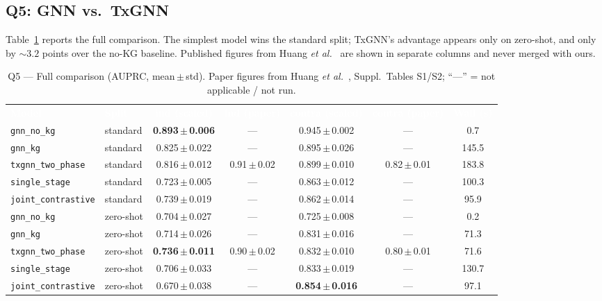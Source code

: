 \documentclass[conference]{IEEEtran}
\newcommand{\hdr}[1]{\textcolor{white}{\textbf{#1}}}
\newcommand{\best}[1]{\textcolor{cgood}{\textbf{#1}}}
\begin{document}
\subsection{Q5: GNN vs.\ TxGNN}
Table~\ref{tab:q5} reports the full comparison. The simplest model wins the
standard split; TxGNN's advantage appears only on zero-shot, and only by
${\sim}3.2$ points over the no-KG baseline. Published figures from
Huang \emph{et al.}~\cite{huang2024} are shown in separate columns and never
merged with ours.

\begin{table}[t]
\centering
\caption{Q5 --- Full comparison (AUPRC, mean\,$\pm$\,std). Paper figures from
Huang \emph{et al.}~\cite{huang2024}, Suppl.\ Tables S1/S2; ``---'' = not
applicable / not run.}
\label{tab:q5}
\renewcommand{\arraystretch}{1.25}
\begin{tabular}{l l c c c c c}
\rowcolor{brandindigo}
\hdr{Model} & \hdr{Split} & \hdr{ind (scaled)} & \hdr{ind (paper)} &
\hdr{contra (scaled)} & \hdr{contra (paper)} & \hdr{Wall (s)}\\
\texttt{gnn\_no\_kg}        & standard  & \best{0.893\,$\pm$\,0.006} & --- & 0.945\,$\pm$\,0.002 & --- & 0.7\\
\rowcolor{rowalt}
\texttt{gnn\_kg}            & standard  & 0.825\,$\pm$\,0.022 & --- & 0.895\,$\pm$\,0.026 & --- & 145.5\\
\texttt{txgnn\_two\_phase}  & standard  & 0.816\,$\pm$\,0.012 & 0.91\,$\pm$\,0.02 & 0.899\,$\pm$\,0.010 & 0.82\,$\pm$\,0.01 & 183.8\\
\rowcolor{rowalt}
\texttt{single\_stage}      & standard  & 0.723\,$\pm$\,0.005 & --- & 0.863\,$\pm$\,0.012 & --- & 100.3\\
\texttt{joint\_contrastive} & standard  & 0.739\,$\pm$\,0.019 & --- & 0.862\,$\pm$\,0.014 & --- & 95.9\\
\rowcolor{rowalt}
\texttt{gnn\_no\_kg}        & zero-shot & 0.704\,$\pm$\,0.027 & --- & 0.725\,$\pm$\,0.008 & --- & 0.2\\
\texttt{gnn\_kg}            & zero-shot & 0.714\,$\pm$\,0.026 & --- & 0.831\,$\pm$\,0.016 & --- & 71.3\\
\rowcolor{rowalt}
\texttt{txgnn\_two\_phase}  & zero-shot & \best{0.736\,$\pm$\,0.011} & 0.90\,$\pm$\,0.02 & 0.832\,$\pm$\,0.010 & 0.80\,$\pm$\,0.01 & 71.6\\
\texttt{single\_stage}      & zero-shot & 0.706\,$\pm$\,0.033 & --- & 0.833\,$\pm$\,0.019 & --- & 130.7\\
\rowcolor{rowalt}
\texttt{joint\_contrastive} & zero-shot & 0.670\,$\pm$\,0.038 & --- & \best{0.854\,$\pm$\,0.016} & --- & 97.1\\
\end{tabular}
\end{table}
\end{document}
